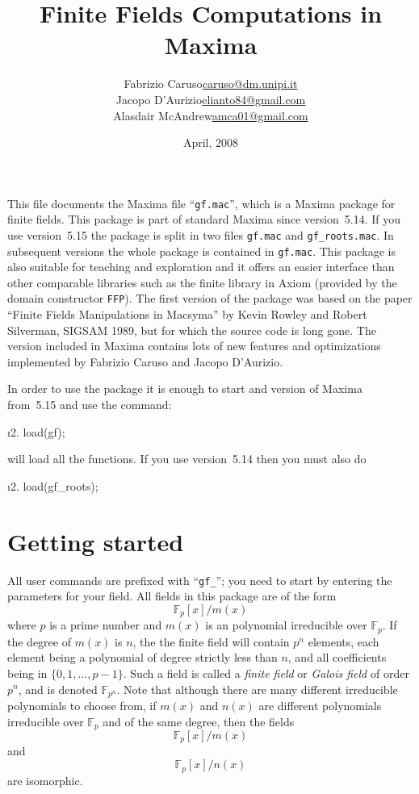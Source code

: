 \documentclass[a4paper,11pt,leqno,fleqn]{artikel3}
\title{Finite Fields Computations in Maxima}
\author{
\begin{tabular}{lr}  Fabrizio Caruso &  \url{caruso@dm.unipi.it} \\
 Jacopo D'Aurizio &  \url{elianto84@gmail.com} \\
 Alasdair McAndrew & \url{amca01@gmail.com} 
\end{tabular}
}
\date{April, 2008}
\begin{document}
\maketitle

This file documents the Maxima file ``\texttt{gf.mac}'', which 
is a Maxima package for finite fields.
This package is part of standard Maxima since version~5.14.
If you use version~5.15 the package is split in two files
\texttt{gf.mac} and \texttt{gf\_roots.mac}.
In subsequent versions the whole package is contained
in \texttt{gf.mac}. 
This package is also suitable for teaching and exploration
and it offers an easier interface than other comparable
libraries such as the finite library in Axiom
(provided by the domain constructor \texttt{FFP}).
The first version of the package was based on the paper
``Finite Fields Manipulations in Macsyma'' by Kevin Rowley and Robert
Silverman, SIGSAM 1989, but for which the source code is long gone.
The version included in Maxima contains lots of new features
and optimizations implemented by Fabrizio Caruso and Jacopo D'Aurizio.





In order to use the package it is enough to start and version
of Maxima from~5.15 and use the command:
\begin{maximasession}
  \maximaoutput*
\i2. load(gf);\\
\end{maximasession}
will load all the functions.
\noindent If you use version~5.14 then you must also do
\begin{maximasession}
  \maximaoutput*
\i2. load(gf_roots);\\
\end{maximasession}

\section*{Getting started}
All user commands are prefixed with ``\verb!gf_!''; you need to start by
entering the parameters for your field.  All fields in this package are of the
form
\[
\mathbb{F}_p[x]/{m(x)}
\]
where $p$ is a prime number and $m(x)$ is an polynomial irreducible over
$\mathbb{F}_p$.  If the degree of $m(x)$ is $n$, the the finite
field will contain $p^n$ elements, each element being a polynomial of degree
strictly less than $n$, and all coefficients being in $\{0,1,\ldots,p-1\}$.
Such a field is called a \emph{finite field} or \emph{Galois field} of order
$p^n$, and is denoted $\mathbb{F}_{p^n}$.  Note that although there are many different
irreducible polynomials to choose from, if $m(x)$ and $n(x)$ are different
polynomials irreducible over $\mathbb{F}_p$  and of the same degree,
then the fields 
\[
\mathbb{F}_p[x]/{m(x)}
\]
and
\[
\mathbb{F}_p[x]/{n(x)}
\]
are isomorphic.
\end{document}
